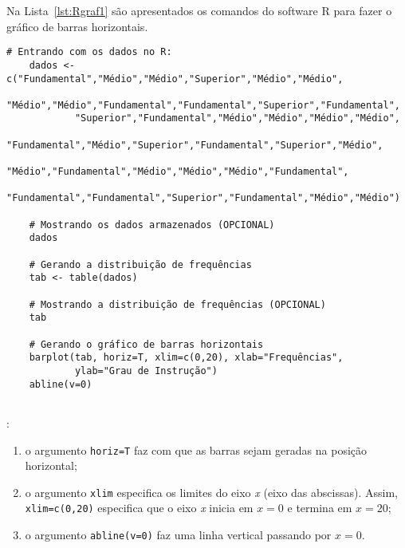 \documentclass[11pt,fleqn]{book} %
\begin{document}

Na Lista~\ref{lst:Rgraf1} são apresentados os comandos do software R para fazer o gráfico de barras horizontais. \\ 


\begin{scriptsize}
	\estiloR
	\begin{lstlisting}[caption={Comandos do software R}, label=lst:Rgraf1]
	# Entrando com os dados no R:
	dados <- c("Fundamental","Médio","Médio","Superior","Médio","Médio",
			"Médio","Médio","Fundamental","Fundamental","Superior","Fundamental",
			"Superior","Fundamental","Médio","Médio","Médio","Médio",
			"Fundamental","Médio","Superior","Fundamental","Superior","Médio",
			"Médio","Fundamental","Médio","Médio","Médio","Fundamental",
			"Fundamental","Fundamental","Superior","Fundamental","Médio","Médio")
	
	# Mostrando os dados armazenados (OPCIONAL)
	dados
	
	# Gerando a distribuição de frequências
	tab <- table(dados)

	# Mostrando a distribuição de frequências (OPCIONAL)
	tab
	
	# Gerando o gráfico de barras horizontais
	barplot(tab, horiz=T, xlim=c(0,20), xlab="Frequências", 
			ylab="Grau de Instrução")
	abline(v=0)
	
	\end{lstlisting}
\end{scriptsize}


\vspace{0,5 cm}

: 

\begin{enumerate}[label=\alph*)]

\item o argumento \texttt{horiz=T} faz com que as barras sejam geradas na posição horizontal;

\item o argumento \texttt{xlim} especifica os limites do eixo {\itshape x} (eixo das abscissas). Assim, \texttt{xlim=c(0,20)} especifica que o eixo {\itshape x} inicia em $x=0$ e termina em $x=20$;

\item o argumento \texttt{abline(v=0)} faz uma linha vertical passando por $x=0$.

\end{enumerate}
\end{document}
